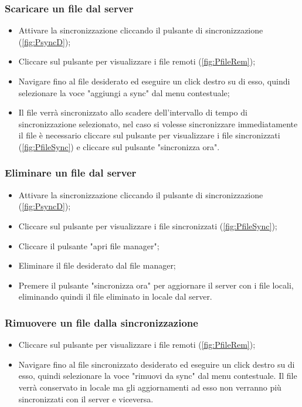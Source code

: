\subsubsection{Scaricare un file dal server}
\begin{itemize}
\item Attivare la sincronizzazione cliccando il pulsante di sincronizzazione (\ref{fig:PsyncD});
\item Cliccare sul pulsante per visualizzare i file remoti (\ref{fig:PfileRem});
\item Navigare fino al file desiderato ed eseguire un click destro su di esso, quindi selezionare la voce "aggiungi a sync" dal menu contestuale;
\item Il file verrà sincronizzato allo scadere dell'intervallo di tempo di sincronizzazione selezionato, nel caso si volesse sincronizzare immediatamente il file è necessario cliccare sul pulsante per visualizzare i file sincronizzati (\ref{fig:PfileSync}) e cliccare sul pulsante "sincronizza ora".
\end{itemize}
\subsubsection{Eliminare un file dal server}
\begin{itemize}
\item Attivare la sincronizzazione cliccando il pulsante di sincronizzazione (\ref{fig:PsyncD});
\item Cliccare sul pulsante per visualizzare i file sincronizzati (\ref{fig:PfileSync});
\item Cliccare il pulsante "apri file manager";
\item Eliminare il file desiderato dal file manager;
\item Premere il pulsante "sincronizza ora" per aggiornare il server con i file locali, eliminando quindi il file eliminato in locale dal server.
\end{itemize}
\subsubsection{Rimuovere un file dalla sincronizzazione}
\begin{itemize}
\item Cliccare sul pulsante per visualizzare i file remoti (\ref{fig:PfileRem});
\item Navigare fino al file sincronizzato desiderato ed eseguire un click destro su di esso, quindi selezionare la voce "rimuovi da sync" dal menu contestuale. Il file verrà conservato in locale ma gli aggiornamenti ad esso non verranno più sincronizzati con il server e viceversa.
\end{itemize}


